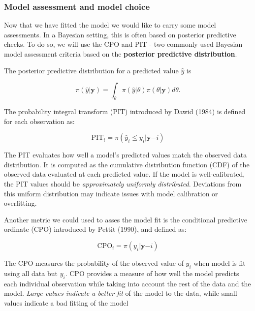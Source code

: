 \documentclass[
  letterpaper,
  DIV=11,
  numbers=noendperiod]{scrartcl}
\begin{document}
\subsubsection{Model assessment and model
choice}\label{model-assessment-and-model-choice}

Now that we have fitted the model we would like to carry some model
assessments. In a Bayesian setting, this is often based on posterior
predictive checks. To do so, we will use the CPO and PIT - two commonly
used Bayesian model assessment criteria based on the \textbf{posterior
predictive distribution}.

\begin{tcolorbox}[enhanced jigsaw, titlerule=0mm, breakable, opacitybacktitle=0.6, rightrule=.15mm, left=2mm, arc=.35mm, toptitle=1mm, coltitle=black, colframe=quarto-callout-note-color-frame, opacityback=0, colback=white, bottomrule=.15mm, leftrule=.75mm, colbacktitle=quarto-callout-note-color!10!white, bottomtitle=1mm, title=\textcolor{quarto-callout-note-color}{\faInfo}\hspace{0.5em}{Posterior predictive model checking}, toprule=.15mm]

The posterior predictive distribution for a predicted value \(\hat{y}\)
is

\[
\pi(\hat{y}|\mathbf{y}) = \int_\theta \pi(\hat{y}|\theta)\pi(\theta|\mathbf{y})d\theta.
\]

The probability integral transform (PIT) introduced by Dawid (1984) is
defined for each observation as:

\[
\mathrm{PIT}_i = \pi(\hat{y}_i \leq y_i |\mathbf{y}{-i})
\]

The PIT evaluates how well a model's predicted values match the observed
data distribution. It is computed as the cumulative distribution
function (CDF) of the observed data evaluated at each predicted value.
If the model is well-calibrated, the PIT values should be
\emph{approximately uniformly distributed}. Deviations from this uniform
distribution may indicate issues with model calibration or overfitting.

Another metric we could used to asses the model fit is the conditional
predictive ordinate (CPO) introduced by Pettit (1990), and deﬁned as:

\[
\text{CPO}_i = \pi(y_i| \mathbf{y}{-i})
\]

The CPO measures the probability of the observed value of \(y_i\) when
model is fit using all data but \(y_i\). CPO provides a measure of how
well the model predicts each individual observation while taking into
account the rest of the data and the model. \emph{Large values indicate
a better fit} of the model to the data, while small values indicate a
bad fitting of the model

\end{tcolorbox}
\end{document}

